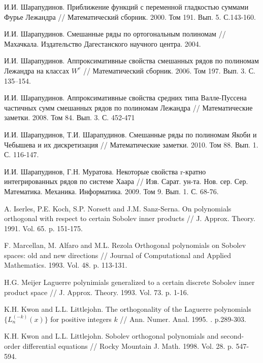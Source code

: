 \begin{thebibliography}{999}
 И.И. Шарапудинов. Приближение функций с переменной гладкостью суммами Фурье Лежандра // Математический сборник. 2000. Том 191. Вып. 5. С.143-160.


 И.И. Шарапудинов. Смешанные ряды по ортогональным полиномам // Махачкала. Издательство Дагестанского научного центра. 2004.


 И.И. Шарапудинов. Аппроксимативные свойства смешанных рядов по полиномам Лежандра на классах $W^r$ // Математический сборник. 2006. Том 197. Вып. 3. С. 135–154.


 И.И. Шарапудинов. Аппроксимативные свойства средних типа Валле-Пуссена частичных сумм смешанных рядов по полиномам Лежандра // Математические заметки. 2008. Том 84. Вып. 3. С. 452-471


 И.И. Шарапудинов, Т.И. Шарапудинов. Смешанные ряды по полиномам Якоби и Чебышева и их дискретизация // Математические заметки. 2010. Том 88. Вып. 1. С. 116-147.


 И.И. Шарапудинов,  Г.Н. Муратова. Некоторые свойства r-кратно интегрированных рядов по системе Хаара // Изв. Сарат. ун-та. Нов. сер. Сер. Математика. Механика. Информатика. 2009. Том 9. Вып. 1. С. 68-76.


 A. Iserles, P.E. Koch, S.P. Norsett and J.M. Sanz-Serna. On polynomials  orthogonal  with respect  to certain Sobolev inner products // J. Approx. Theory. 1991. Vol. 65. p. 151-175.


 F. Marcellan, M. Alfaro and M.L. Rezola Orthogonal polynomials on Sobolev spaces: old and new directions // Journal of Computational and Applied Mathematics. 1993. Vol. 48. p. 113-131.


 H.G. Meijer Laguerre polynimials generalized to a certain discrete Sobolev inner product space // J. Approx. Theory. 1993. Vol. 73. p. 1-16.


 K.H. Kwon and L.L. Littlejohn. The orthogonality of the Laguerre polynomials $\{L_n^{(-k)}(x)\}$ for positive integers $k$ // Ann. Numer. Anal. 1995. . p.289-303.


 K.H. Kwon and L.L. Littlejohn. Sobolev orthogonal polynomials and second-order differential equations // Rocky Mountain J. Math. 1998. Vol. 28. p. 547-594.



\end{thebibliography}
